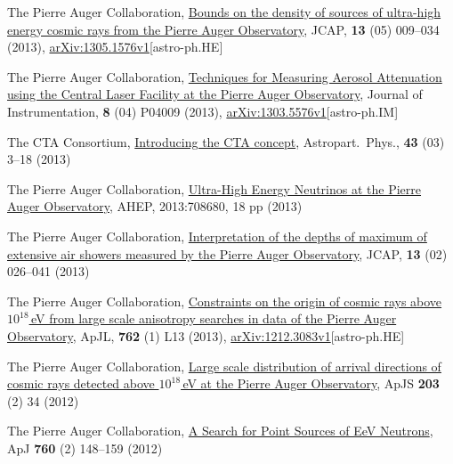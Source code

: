 \begin{etaremune}
\item {}The Pierre Auger Collaboration, \href{http://dx.doi.org/10.1088/1475-7516/2013/05/009}{{Bounds on the density of sources of ultra-high energy cosmic rays from the Pierre Auger Observatory}}, JCAP, {\textbf{13}} (05) 009--034 (2013), \href{http://arxiv.org/abs/1305.1576}{arXiv:1305.1576v1}[astro-ph.HE]

\item {}The Pierre Auger Collaboration, \href{http://dx.doi.org/10.1088/1748-0221/8/04/P04009}{{Techniques for Measuring Aerosol Attenuation using the Central Laser Facility at the Pierre Auger Observatory}}, Journal of Instrumentation, {\textbf{8}} (04) P04009 (2013), \href{http://arxiv.org/abs/1303.5576}{arXiv:1303.5576v1}[astro-ph.IM]

\item {}The CTA Consortium, \href{http://dx.doi.org/10.1016/j.astropartphys.2013.01.007}{{Introducing the CTA concept}}, Astropart.\ Phys., {\textbf{43}} (03) 3--18 (2013)

\item {}The Pierre Auger Collaboration, \href{http://dx.doi.org/10.1155/2013/708680
}{{Ultra-High Energy Neutrinos at the Pierre Auger Observatory}}, AHEP, 2013:708680, 18 pp (2013)

\item {}The Pierre Auger Collaboration, \href{http://dx.doi.org/10.1088/1475-7516/2013/02/026}{{Interpretation of the depths of maximum of extensive air showers measured by the Pierre Auger Observatory}}, JCAP, {\textbf{13}} (02) 026--041 (2013) %

\item {}The Pierre Auger Collaboration, \href{http://dx.doi.org/10.1088/2041-8205/762/1/L13}{{Constraints on the origin of cosmic rays above $10^{18}$\,eV from large scale anisotropy searches in data of the Pierre Auger Observatory}}, ApJL, {\textbf{762}} (1) L13 (2013), \href{http://arxiv.org/abs/1212.3083}{arXiv:1212.3083v1}[astro-ph.HE]

\item {}The Pierre Auger Collaboration,
\href{http://dx.doi.org/10.1088/0067-0049/203/2/34}{{Large scale
distribution of arrival directions of cosmic rays detected above $10^{18}$\,eV
at the Pierre Auger Observatory}}, ApJS {\textbf{203}} (2) 34 (2012)

\item {}The Pierre Auger Collaboration,
\href{http://dx.doi.org/10.1088/0004-637X/760/2/148}{{A Search for Point
Sources of EeV Neutrons}}, ApJ {\textbf{760}} (2) 148--159 (2012)


\end{etaremune}
